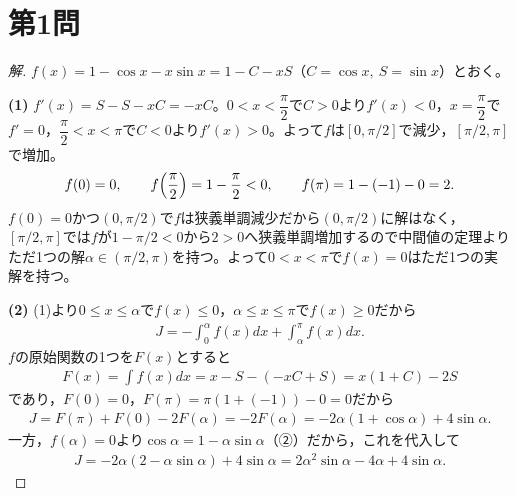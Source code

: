 \documentclass[../main.tex]{subfiles}
\begin{document}
\section*{第1問}

\begin{proof}[解]
  $f(x)=1-\cos x-x\sin x=1-C-xS$（$C=\cos x,\ S=\sin x$）とおく。

  \textbf{(1)} $f'(x)=S-S-xC=-xC$。$0<x<\dfrac\pi2$で$C>0$より$f'(x)<0$，$x=\dfrac\pi2$で$f'=0$，$\dfrac\pi2<x<\pi$で$C<0$より$f'(x)>0$。よって$f$は$[0,\pi/2]$で減少，$[\pi/2,\pi]$で増加。
  \begin{align*}
    f(0)=0,\qquad f\Bigl(\frac\pi2\Bigr)=1-\frac\pi2<0,\qquad f(\pi)=1-(-1)-0=2.
  \end{align*}
  $f(0)=0$かつ$(0,\pi/2)$で$f$は狭義単調減少だから$(0,\pi/2)$に解はなく，$[\pi/2,\pi]$では$f$が$1-\pi/2<0$から$2>0$へ狭義単調増加するので中間値の定理よりただ1つの解$\alpha\in(\pi/2,\pi)$を持つ。よって$0<x<\pi$で$f(x)=0$はただ1つの実解を持つ。

  \textbf{(2)} (1)より$0\le x\le\alpha$で$f(x)\le0$，$\alpha\le x\le\pi$で$f(x)\ge0$だから
  \begin{align*}
    J=-\int_0^\alpha f(x)dx+\int_\alpha^\pi f(x)dx.\tag{①}
  \end{align*}
  $f$の原始関数の1つを$F(x)$とすると
  \begin{align*}
    F(x)=\int f(x)dx=x-S-(-xC+S)=x(1+C)-2S
  \end{align*}
  であり，$F(0)=0$，$F(\pi)=\pi(1+(-1))-0=0$だから
  \begin{align*}
    J=F(\pi)+F(0)-2F(\alpha)=-2F(\alpha)=-2\alpha(1+\cos\alpha)+4\sin\alpha.
  \end{align*}
  一方，$f(\alpha)=0$より$\cos\alpha=1-\alpha\sin\alpha$（②）だから，これを代入して
  \begin{align*}
    J=-2\alpha(2-\alpha\sin\alpha)+4\sin\alpha=2\alpha^2\sin\alpha-4\alpha+4\sin\alpha.
  \end{align*}


\end{proof}
\end{document}
